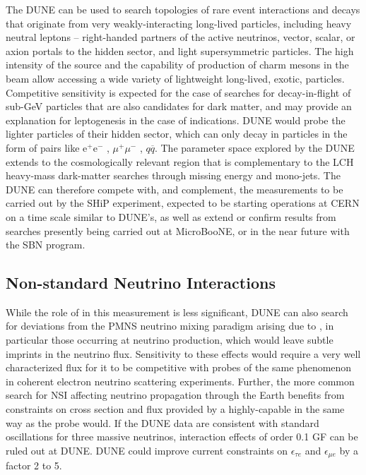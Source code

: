 The DUNE  can be used to search topologies of rare event interactions and decays that originate from very weakly-interacting long-lived particles, including heavy neutral leptons -- right-handed partners of the active neutrinos, vector, scalar, or axion portals to the hidden sector, and light supersymmetric particles. The high intensity of the  source and the capability of  production of charm mesons in the beam allow accessing a wide variety of lightweight long-lived, exotic, particles. Competitive sensitivity is expected for the case of searches for decay-in-flight of sub-GeV particles that are also candidates for dark matter, and may provide an explanation for leptogenesis in the case of  indications. DUNE would probe the lighter particles of their hidden sector, which can only decay in  particles in the form of pairs like e$^{+}$e$^{-}$  , $\mu^{+}\mu^{-}$ , $q\overline{q}$. The parameter space explored by the DUNE  extends to the cosmologically relevant region that is complementary to the LCH heavy-mass dark-matter searches through missing energy and mono-jets. The DUNE  can therefore compete with, and complement, the measurements to be carried out by the SHiP experiment, expected to be starting operations at CERN on a time scale similar to DUNE's, as well as extend or confirm results from searches presently being carried out at MicroBooNE, or in the near future with the SBN program.

\subsection{Non-standard Neutrino Interactions}
\label{ssec:exsum-nd-BSMappendix-NSI}

While the role of  in this measurement is less significant, DUNE can also search for deviations from the PMNS neutrino mixing paradigm arising due to , in particular those occurring at neutrino production, which would leave subtle imprints in the neutrino flux. Sensitivity to these effects would require a very well characterized flux for it to be competitive with probes of the same phenomenon in coherent electron neutrino scattering experiments. Further, the more common search for NSI affecting neutrino propagation through the Earth benefits from constraints on cross section and flux provided by a highly-capable  in the same way as the  probe would. If the DUNE data are consistent with standard oscillations for three massive neutrinos, interaction effects of order 0.1 GF   can be ruled out at DUNE. DUNE could improve current constraints on $\epsilon_{\tau e}$ and $\epsilon_{\mu e}$ by a factor 2 to 5.


